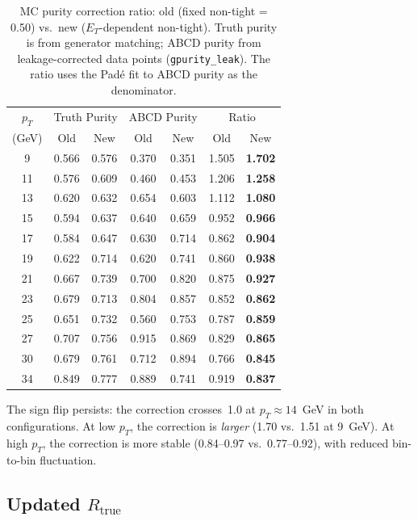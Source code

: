 \documentclass[11pt,a4paper]{article}
\begin{document}
\begin{table}[H]
\centering
\caption{MC purity correction ratio: old (fixed non-tight = 0.50) vs.\ new
         ($E_T$-dependent non-tight). Truth purity is from generator matching;
         ABCD purity from leakage-corrected data points (\texttt{gpurity\_leak}).
         The ratio uses the Pad\'e fit to ABCD purity as the denominator.}
\label{tab:ratio_comparison}
\begin{tabular}{@{}ccccccc@{}}
\toprule
$p_T$ & \multicolumn{2}{c}{Truth Purity} & \multicolumn{2}{c}{ABCD Purity} & \multicolumn{2}{c}{Ratio} \\
(GeV) & Old & New & Old & New & Old & New \\
\midrule
 9  & 0.566 & 0.576 & 0.370 & 0.351 & 1.505 & \textbf{1.702} \\
11  & 0.576 & 0.609 & 0.460 & 0.453 & 1.206 & \textbf{1.258} \\
13  & 0.620 & 0.632 & 0.654 & 0.603 & 1.112 & \textbf{1.080} \\
15  & 0.594 & 0.637 & 0.640 & 0.659 & 0.952 & \textbf{0.966} \\
17  & 0.584 & 0.647 & 0.630 & 0.714 & 0.862 & \textbf{0.904} \\
19  & 0.622 & 0.714 & 0.620 & 0.741 & 0.860 & \textbf{0.938} \\
21  & 0.667 & 0.739 & 0.700 & 0.820 & 0.875 & \textbf{0.927} \\
23  & 0.679 & 0.713 & 0.804 & 0.857 & 0.852 & \textbf{0.862} \\
25  & 0.651 & 0.732 & 0.560 & 0.753 & 0.787 & \textbf{0.859} \\
27  & 0.707 & 0.756 & 0.915 & 0.869 & 0.829 & \textbf{0.865} \\
30  & 0.679 & 0.761 & 0.712 & 0.894 & 0.766 & \textbf{0.845} \\
34  & 0.849 & 0.777 & 0.889 & 0.741 & 0.919 & \textbf{0.837} \\
\bottomrule
\end{tabular}
\end{table}

The sign flip persists: the correction crosses~1.0 at $p_T \approx 14$~GeV
in both configurations. At low $p_T$, the correction is \emph{larger}
(1.70 vs.\ 1.51 at 9~GeV). At high $p_T$, the correction is more stable
(0.84--0.97 vs.\ 0.77--0.92), with reduced bin-to-bin fluctuation.

\subsection{Updated $R_{\mathrm{true}}$}
\end{document}
